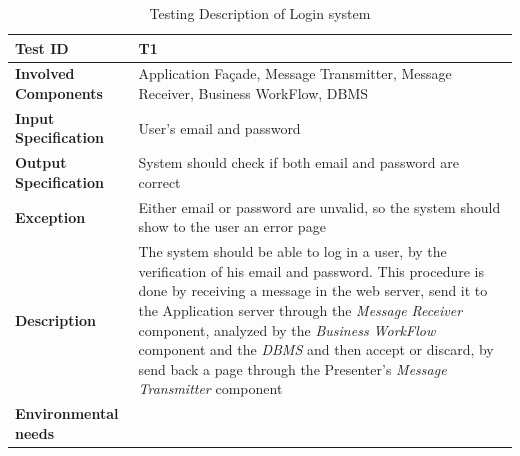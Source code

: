 \begin{table}[H]
    \centering
    \begin{tabular}{p{4.55cm} p{7cm}}
        
        \hline
        
        \textbf{Test ID}                & T1 \\
        
        \hline
        
        \textbf{Involved Components}    & Application Façade, Message Transmitter, Message Receiver, Business                                          WorkFlow, DBMS\\
        
        \hline
        
        \textbf{Input Specification}    & User's email and password\\
        
        \hline
        
        \textbf{Output Specification}   & System should check if both email and password are correct\\
        
        \hline
        
        \textbf{Exception}              & Either email or password are unvalid, so the system should show to the                                       user an error page\\
        
        \hline
        
        \textbf{Description}            & The system should be able to log in a user, by the verification of his                                      email and password. This procedure is done by receiving a message in the web server, send it to the Application server through the \emph{Message Receiver} component, analyzed by the \emph{Business WorkFlow} component and the \emph{DBMS} and then accept or discard, by send back a page through the Presenter's \emph{Message Transmitter} component\\
        
        \hline
        
        \textbf{Environmental needs}    & \\
        
        \hline
        
    \end{tabular}
    \caption{Testing Description of Login system}
\end{table}



